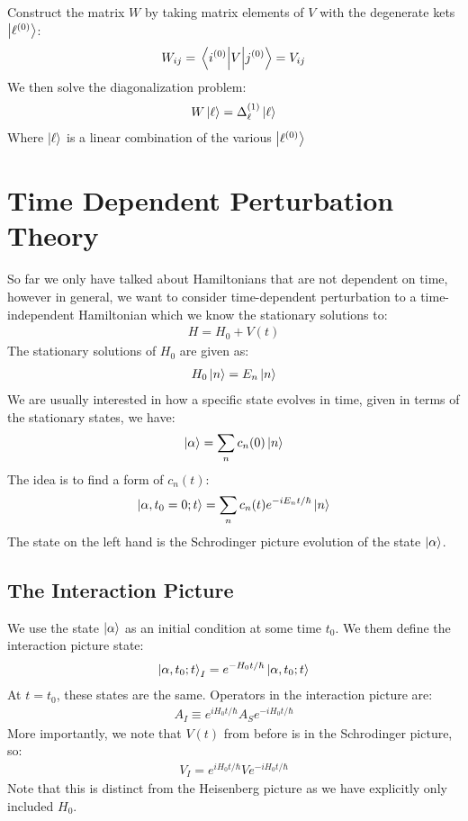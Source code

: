 \documentclass[12pt]{article}
\begin{document}
Construct the matrix $W$ by taking matrix elements of $V$ with the degenerate kets $\ket{\ell^{(0)}}$:
\begin{align*}
  W_{ij}=\mel{i^{(0)}}{V}{j^{(0)}}=V_{ij}
\end{align*}
We then solve the diagonalization problem:
\begin{align*}
  W\ket{\ell}=\Delta_\ell^{(1)}\ket{\ell}
\end{align*}
Where $\ket{\ell}$ is a linear combination of the various $\ket{\ell^{(0)}}$

\section{Time Dependent Perturbation Theory}
So far we only have talked about Hamiltonians that are not dependent on time, however in general, we want to consider time-dependent perturbation to a time-independent Hamiltonian which we know the stationary solutions to:
\begin{align*}
  H=H_0+V(t)
\end{align*}
The stationary solutions of $H_0$ are given as:
\begin{align*}
  H_0\ket{n}=E_n\ket{n}
\end{align*}
We are usually interested in how a specific state evolves in time, given in terms of the stationary states, we have:
\begin{align*}
  \ket{\alpha}=\sum_n c_n(0)\ket{n}
\end{align*}
The idea is to find a form of $c_n(t)$:
\begin{align*}
  \ket{\alpha,t_0=0;t}=
  \sum_n c_n(t)e^{-iE_n t/\hbar}\ket{n}
\end{align*}
The state on the left hand is the Schrodinger picture evolution of the state $\ket{\alpha}$.
\subsection{The Interaction Picture}
We use the state $\ket{\alpha}$ as an initial condition at some time $t_0$. We them define the interaction picture state:
\begin{align*}
  \ket{\alpha,t_0;t}_I=e^{-H_0 t/\hbar}\ket{\alpha,t_0;t}
\end{align*}
At $t=t_0$, these states are the same. Operators in the interaction picture are:
\begin{align*}
  A_I\equiv e^{iH_0 t/\hbar}A_S e^{-iH_0 t/\hbar}
\end{align*}
More importantly, we note that $V(t)$ from before is in the Schrodinger picture, so:
\begin{align*}
  V_I= e^{iH_0 t/\hbar}V e^{-iH_0 t/\hbar}
\end{align*}
Note that this is distinct from the Heisenberg picture as we have explicitly only included $H_0$.
\end{document}
